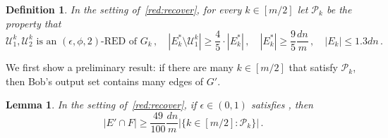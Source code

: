\documentclass[epsfig,letter,11pt]{article}
\numberwithin{equation}{section}
\newtheorem{definition}[theorem]{Definition}
\newtheorem{lemma}[theorem]{Lemma}
\begin{document}
\begin{definition}
	\label{def:pk}
	In the setting of~\cref{red:recover}, for every $k \in [m/2]$ let $\mathcal{P}_k$ be the property that
	\begin{equation}
		\label{eq:propertypk}
		\text{$\mathcal{U}_1^k,\mathcal{U}_2^k$ is an $(\epsilon,\phi,2)$-RED of  $G_k$}\, ,\quad \left| E^*_k \setminus \mathcal{U}^k_1\right| \ge \frac{4}{5} \cdot \left|E^*_k\right| \, , \quad |E_k^*| \ge \frac{9}{5}\frac{dn}{m}\,, \quad |E_k|\le 1.3 dn\, .
	\end{equation}
\end{definition}
\noindent
We first show a preliminary result: if there are many $k \in [m/2]$ that satisfy $\mathcal{P}_k$, then Bob's output set contains many edges of $G'$.
\begin{lemma}
	\label{lem:almostthere}
	In the setting of~\cref{red:recover}, if $\epsilon \in (0,1)$ satisfies , then
	\begin{equation*}
			|E' \cap F|  \ge \frac{49}{100} \frac{dn}{m}  |\{k\in [m/2] : \mathcal{P}_k\}| \, .
	\end{equation*}
\end{lemma}
\end{document}
